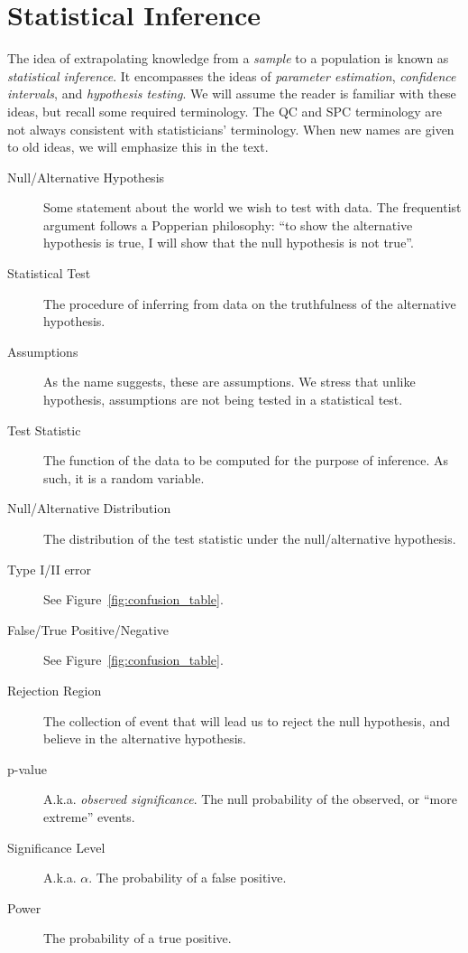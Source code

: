 \documentclass[12pt,a4paper]{report}
\begin{document}
\afterpage{\clearpage}


\chapter{Statistical Inference} 
The idea of extrapolating knowledge from a \emph{sample} to a population is known as \emph{statistical inference}.
It encompasses the ideas of \emph{parameter estimation}, \emph{confidence intervals}, and \emph{hypothesis testing}.
We will assume the reader is familiar with these ideas, but recall some required terminology.
The QC and SPC terminology are not always consistent with statisticians' terminology. When new names are given to old ideas, we will emphasize this in the text.

\begin{description}
\item [Null/Alternative Hypothesis] Some statement about the world we wish to test with data. The frequentist argument follows a Popperian philosophy: ``to show the alternative hypothesis is true, I will show that the null hypothesis is not true''. 
\item [Statistical Test] The procedure of inferring from data on the truthfulness of the alternative hypothesis.
\item [Assumptions] As the name suggests, these are assumptions. We stress that unlike hypothesis, assumptions are not being tested in a statistical test. 
\item [Test Statistic] The function of the data to be computed for the purpose of inference. As such, it is a random variable. 
\item [Null/Alternative Distribution] The distribution of the test statistic under the null/alternative hypothesis.
\item [Type I/II error] See Figure~\ref{fig:confusion_table}.
\item [False/True Positive/Negative] See Figure~\ref{fig:confusion_table}.
\item [Rejection Region] The collection of event that will lead us to reject the null hypothesis, and believe in the alternative hypothesis.
\item [p-value] A.k.a. \emph{observed significance}. The null probability of the observed, or ``more extreme'' events.
\item [Significance Level] A.k.a. $\alpha$. The probability of a false positive.
\item [Power] The probability of a true positive.

\end{description}
\end{document}
